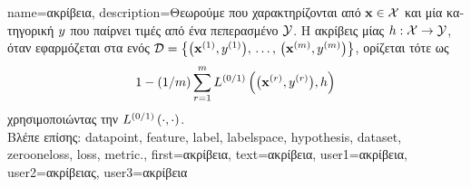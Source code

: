 {name={\foreignlanguage{greek}{ακρίβεια}},
	description={\foreignlanguage{greek}{Θεωρούμε} 
		 \foreignlanguage{greek}{που χαρακτηρίζονται από}  ${\bf x} \in \mathcal{X}$ 
		\foreignlanguage{greek}{και μία κατηγορική} 
		$y$ \foreignlanguage{greek}{που παίρνει τιμές από ένα πεπερασμένο}  $\mathcal{Y}$. 
		\foreignlanguage{greek}{Η ακρίβεις μίας}  
		$h: \mathcal{X} \rightarrow \mathcal{Y}$, \foreignlanguage{greek}{όταν εφαρμόζεται στα}  
		 \foreignlanguage{greek}{ενός}  
		$\mathcal{D} = \big\{ \big({\bf x}^{(1)}, y^{(1)} \big), \,\ldots, \,\big({\bf x}^{(m)},y^{(m)}\big) \big\}$, 
		\foreignlanguage{greek}{ορίζεται τότε ως} 
		$$1 - (1/m)\sum_{r=1}^{m} L^{(0/1)}\left(\big({\bf x}^{(r)},y^{(r)}\big),h \right)$$ 
		\foreignlanguage{greek}{χρησιμοποιώντας την}  $L^{(0/1)}\left(\cdot,\cdot \right)$.\\
		\foreignlanguage{greek}{Βλέπε επίσης:} \gls{datapoint}, \gls{feature}, \gls{label}, \gls{labelspace}, \gls{hypothesis}, \gls{dataset}, \gls{zerooneloss}, 
		\gls{loss}, \gls{metric}.},
	first={\foreignlanguage{greek}{ακρίβεια}},
	text={\foreignlanguage{greek}{ακρίβεια}},
	user1={\foreignlanguage{greek}{ακρίβεια}}, %
	user2={\foreignlanguage{greek}{ακρίβειας}}, %
	user3={\foreignlanguage{greek}{ακρίβεια}} %
}


